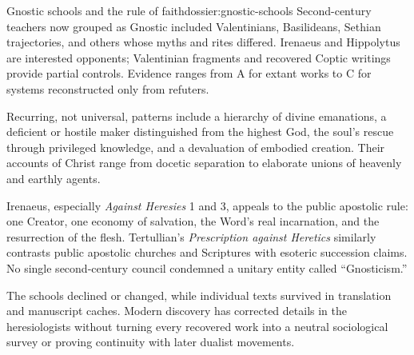 \begin{heresydossier}{Gnostic schools and the rule of faith}{dossier:gnostic-schools}
\objectfield Second-century teachers now grouped as Gnostic included Valentinians, Basilideans, Sethian trajectories, and others whose myths and rites differed. Irenaeus and Hippolytus are interested opponents; Valentinian fragments and recovered Coptic writings provide partial controls. Evidence ranges from A for extant works to C for systems reconstructed only from refuters.

\propositionfield Recurring, not universal, patterns include a hierarchy of divine emanations, a deficient or hostile maker distinguished from the highest God, the soul's rescue through privileged knowledge, and a devaluation of embodied creation. Their accounts of Christ range from docetic separation to elaborate unions of heavenly and earthly agents.

\responsefield Irenaeus, especially \emph{Against Heresies} 1 and 3, appeals to the public apostolic rule: one Creator, one economy of salvation, the Word's real incarnation, and the resurrection of the flesh. Tertullian's \emph{Prescription against Heretics} similarly contrasts public apostolic churches and Scriptures with esoteric succession claims. No single second-century council condemned a unitary entity called ``Gnosticism.''

\aftermathfield The schools declined or changed, while individual texts survived in translation and manuscript caches. Modern discovery has corrected details in the heresiologists without turning every recovered work into a neutral sociological survey or proving continuity with later dualist movements.
\end{heresydossier}

